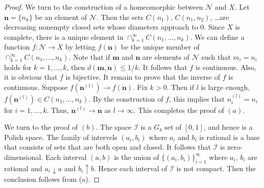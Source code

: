 \documentclass[11pt]{article}
\theoremstyle{plain}
\theoremstyle{definition}
\theoremstyle{remark}
\begin{document}
\begin{proof}
    We turn to the construction of a homeomorphic between $\mathscr N$ and $X$.
    Let $\mathbf n = \{n_k\}$ be an element of $\mathscr N$.
    Then the sets $C(n_1)$, $C(n_1,n_2)$, \dots are decreasing nonempty closed sets whose diameters approach to $0$.
    Since $X$ is complete, there is a unique element in $\cap_{k=1}^\infty C(n_1,\dots,n_k)$.
    We can define a function $f: \mathscr N \to X$ by letting $f(\mathbf n)$ be the unique member of $\cap_{k=1}^\infty C(n_1,\dots,n_k)$.
    Note that if $\mathbf m$ and $\mathbf n$ are elements of $\mathscr N$ such that $m_i = n_i$ holds for $k=1,\dots,k$, then $d(\mathbf m, \mathbf n) \leq 1/k$.
    It follows that $f$ is continuous.
    Also, it is obvious that $f$ is bijective.
    It remain to prove that the inverse of $f$ is continuous.
    Suppose $f(\mathbf n^{(l)}) \to f(\mathbf n)$.
    Fix $k>0$.
    Then if $l$ is large enough, $f(\mathbf n^{(l)}) \in C(n_1,\dots,n_k)$.
    By the construction of $f$, this implies that $n^{(l)}_i= n_i$ for $i=1,\dots,k$.
    Thus, $\mathbf n^{(l)} \to \mathbf n$ as $l \to \infty$.
    This completes the proof of $(a)$.

    We turn to the proof of $(b)$.
    The space $\mathscr I$ is a $G_{\delta}$ set of $[0,1]$, and hence is a Polish space.
    The family of intervels $(a_i,b_i)$ where $a_i$ and $b_i$ is rational is a base that consists of sets that are both open and closed.
    It follows that $\mathscr I$ is zero-dimensional.
    Each interval $(a,b)$ is the union of $\{(a_i,b_i)\}_{i=1}^\infty$ where $a_i$, $b_i$ are rational and $a_i \downarrow a$ and $b_i \uparrow b$.
    Hence each interval of $\mathscr I$ is not compact.
    Then the conclusion follows from (a).
    
\end{proof}
\end{document}
